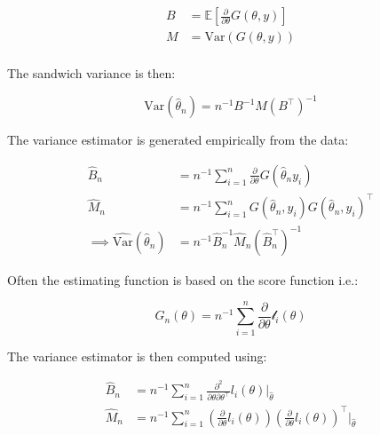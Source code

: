 \documentclass{report}
\begin{document}
\begin{equation}\label{eq:ols-sandwich-pieces}
    \begin{aligned}
        B &= \mathbb{E}\left[\frac{\partial}{\partial\theta}G(\theta, y)\right] \\
        M &= \text{Var}(G(\theta, y)) \\
    \end{aligned}
\end{equation}

The sandwich variance is then:

\begin{equation}\label{eq:ols-sandwich-variance}
    \text{Var}\left(\hat{\theta}_n\right) = n^{-1} B^{-1} M \left(B^\intercal\right)^{-1}
\end{equation}

The variance estimator is generated empirically from the data:

\begin{equation}\label{eq:ols-sandwich-variance-estimator}
    \begin{aligned}
        \hat{B}_n &= n^{-1} \sum_{i=1}^n \frac{\partial}{\partial\theta} G \left(\hat{\theta}_n y_i\right) \\
        \hat{M}_n &= n^{-1} \sum_{i=1}^n G\left(\hat{\theta}_n, y_i\right)G\left(\hat{\theta}_n, y_i\right)^\intercal \\
        \implies \widehat{\text{Var}}\left(\hat{\theta}_n\right) &= n^{-1} \hat{B}_n^{-1} \hat{M}_n \left(\hat{B}_n^\intercal\right)^{-1}
    \end{aligned}
\end{equation}

Often the estimating function is based on the score function i.e.:

\begin{equation}\label{eq:ols-sandwich-score-function}
    G_n(\theta) = n^{-1} \sum_{i=1}^n \frac{\partial}{\partial\theta} \mathcal{l}_i(\theta)
\end{equation}

The variance estimator is then computed using:

\begin{equation}\label{eq:ols-sandwich-score-function-solutions}
    \begin{aligned}
        \hat{B}_n &= n^{-1} \sum_{i=1}^n \frac{\partial^2}{\partial\theta\partial\theta^\intercal} l_i(\theta)\bigg|_{\hat{\theta}} \\
        \hat{M}_n &= n^{-1} \sum_{i=1}^n \left(\frac{\partial}{\partial\theta}l_i(\theta)\right)\left(\frac{\partial}{\partial\theta}l_i(\theta)\right)^\intercal \bigg|_{\hat{\theta}} \\
    \end{aligned}
\end{equation}
\end{document}
